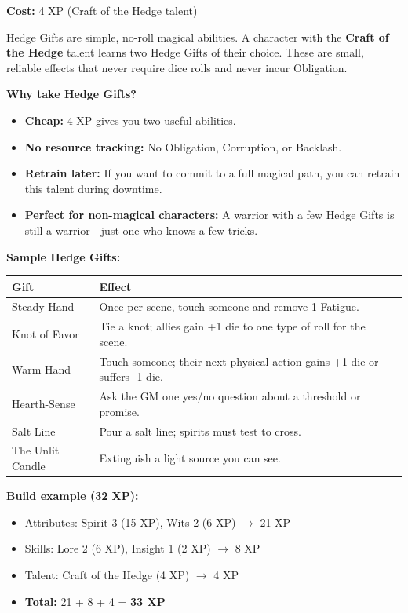 \textbf{Cost:} 4 XP (Craft of the Hedge talent)

Hedge Gifts are simple, no-roll magical abilities. A character with the \textbf{Craft of the Hedge} talent learns two Hedge Gifts of their choice. These are small, reliable effects that never require dice rolls and never incur Obligation.

\textbf{Why take Hedge Gifts?}
\begin{itemize}
  \item \textbf{Cheap:} 4 XP gives you two useful abilities.
  \item \textbf{No resource tracking:} No Obligation, Corruption, or Backlash.
  \item \textbf{Retrain later:} If you want to commit to a full magical path, you can retrain this talent during downtime.
  \item \textbf{Perfect for non-magical characters:} A warrior with a few Hedge Gifts is still a warrior---just one who knows a few tricks.
\end{itemize}

\textbf{Sample Hedge Gifts:}
\begin{center}
\begin{tabular}{ll}
\toprule
\textbf{Gift} & \textbf{Effect} \\
\midrule
Steady Hand & Once per scene, touch someone and remove 1 Fatigue. \\
Knot of Favor & Tie a knot; allies gain +1 die to one type of roll for the scene. \\
Warm Hand & Touch someone; their next physical action gains +1 die or suffers -1 die. \\
Hearth-Sense & Ask the GM one yes/no question about a threshold or promise. \\
Salt Line & Pour a salt line; spirits must test to cross. \\
The Unlit Candle & Extinguish a light source you can see. \\
\bottomrule
\end{tabular}
\end{center}

\textbf{Build example (32 XP):}
\begin{itemize}
  \item Attributes: Spirit 3 (15 XP), Wits 2 (6 XP) $\rightarrow$ 21 XP
  \item Skills: Lore 2 (6 XP), Insight 1 (2 XP) $\rightarrow$ 8 XP
  \item Talent: Craft of the Hedge (4 XP) $\rightarrow$ 4 XP
  \item \textbf{Total:} 21 + 8 + 4 = \textbf{33 XP}
\end{itemize}

